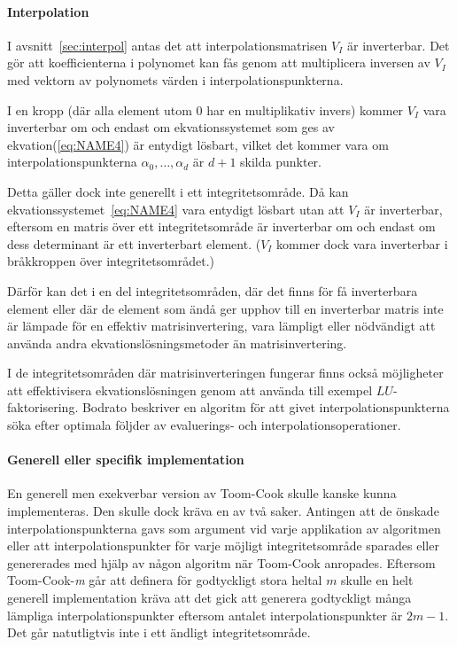 \paragraph{Interpolation}
I avsnitt~\ref{sec:interpol} antas det att interpolationsmatrisen
$V_I$ är inverterbar. Det gör att koefficienterna i polynomet kan fås genom att
multiplicera inversen av $V_I$ med vektorn av polynomets värden i
interpolationspunkterna.

I en kropp (där alla element utom 0 har en multiplikativ invers) kommer $V_I$
vara inverterbar om och endast om ekvationssystemet som ges av ekvation(\ref{eq:NAME4})
är entydigt lösbart, vilket det kommer vara om interpolationspunkterna
$\alpha_0, \dots, \alpha_d$ är $d + 1$ skilda punkter.

Detta gäller dock inte generellt i ett integritetsområde. Då kan
ekvationssystemet~\ref{eq:NAME4} vara entydigt lösbart utan att $V_I$ är
inverterbar, eftersom en matris över ett integritetsområde är inverterbar om
och endast om dess determinant är ett inverterbart
element\cite{sombatboriboon2011some}. ($V_I$ kommer dock vara inverterbar i
bråkkroppen över integritetsområdet.)

Därför kan det i en del integritetsområden, där det finns för få inverterbara element
eller där de element som ändå ger upphov till en inverterbar matris inte är
lämpade för en effektiv matrisinvertering, vara lämpligt eller nödvändigt att
använda andra ekvationslösningsmetoder än matrisinvertering.


I de integritetsområden där matrisinverteringen fungerar finns också
möjligheter att effektivisera ekvationslösningen genom att använda till exempel
$LU$-faktorisering. Bodrato\cite{bodrato2007towards}\cite{bodrato2007integer}
beskriver en algoritm för att givet interpolationspunkterna söka efter optimala
följder av evaluerings- och interpolationsoperationer.

\paragraph{Generell eller specifik implementation}
En generell men exekverbar version av Toom-Cook skulle kanske kunna
implementeras. Den skulle dock kräva en av två saker. Antingen att de önskade
interpolationspunkterna gavs som argument vid varje applikation av algoritmen
eller att interpolationspunkter för varje möjligt integritetsområde sparades
eller genererades med hjälp av någon algoritm när Toom-Cook anropades. Eftersom
Toom-Cook-\emph{m} går att definera för godtyckligt stora heltal $m$ skulle en
helt generell implementation kräva att det gick att generera godtyckligt många
lämpliga interpolationspunkter eftersom antalet interpolationspunkter är $2m-1$.
Det går natutligtvis inte i ett ändligt integritetsområde.


